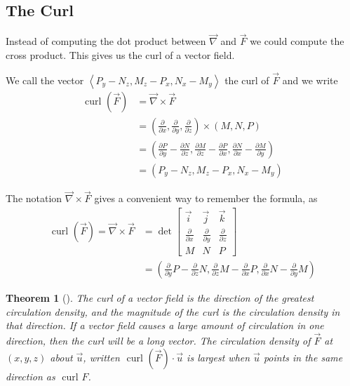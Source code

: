 \documentclass[10pt,]{book}
\theoremstyle{plain}
\newtheorem{theorem}{Theorem}[section]
\theoremstyle{definition}
\theoremstyle{definition}
\theoremstyle{definition}
\theoremstyle{definition}
\theoremstyle{definition}
\numberwithin{equation}{section}
\newcommand{\lt}{<}
\newcommand{\amp}{&}
\begin{document}
\subsection[{The Curl}]{The Curl}\label{subsection-38}
Instead of computing the dot product between \(\vec \nabla\) and \(\vec F\) we could compute the cross product. This gives us the curl of a vector field.%
\par
We call the vector \(\left\lt P_y-N_z,M_z-P_x,N_x-M_y\right>\) the curl of \(\vec F\) and we write%
\begin{align*}
\text{ curl } (\vec F) 
\amp = \vec \nabla \times \vec F\\
\amp = \left(\frac{\partial}{\partial x},\frac{\partial}{\partial y},\frac{\partial}{\partial z}\right) \times (M,N,P)\\
\amp = \left(\frac{\partial P}{\partial y}-\frac{\partial N}{\partial z}, \frac{\partial M}{\partial z}-\frac{\partial P}{\partial x},\frac{\partial N}{\partial x}-\frac{\partial M}{\partial y}\right)\\
\amp =  \left(P_y-N_z,M_z-P_x,N_x-M_y\right)
\end{align*}
%
\par
The notation \(\vec \nabla \times \vec F\) gives a convenient way to remember the formula, as%
\begin{align*}
\text{ curl } (\vec F)=\vec \nabla \times \vec F 
\amp =\det \begin{bmatrix}
\vec i \amp  \vec j \amp  \vec k\\
\frac{\partial}{\partial x}\amp \frac{\partial}{\partial y}\amp \frac{\partial}{\partial z}\\
M\amp N\amp P
\end{bmatrix}\\
\amp = \left(\frac{\partial}{\partial y}P-\frac{\partial}{\partial z}N,\frac{\partial}{\partial z}M-\frac{\partial}{\partial x}P,\frac{\partial}{\partial x}N-\frac{\partial}{\partial y}M\right)
\end{align*}
%
\begin{theorem}[{}]\label{theorem-13}
The curl of a vector field is the direction of the greatest circulation density, and the magnitude of the curl is the circulation density in that direction. If a vector field causes a large amount of circulation in one direction, then the curl will be a long vector. The circulation density of \(\vec F\) at \((x,y,z)\) about \(\vec u\), written \(\text{ curl } (\vec F)\cdot \vec u\) is largest when \(\vec u\) points in the same direction as \(\text{ curl }  F\).%
\end{theorem}
\end{document}
